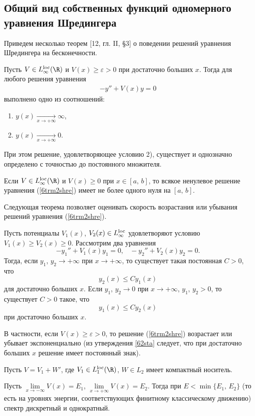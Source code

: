 \documentclass[a4paper
]{article}
\begin{document}
\subsection{Общий вид собственных функций одномерного уравнения Шредингера}
Приведем несколько теорем [12, гл. II, \S 3] о поведении решений
уравнения Шредингера на бесконечности.
\begin{Trm}
\label{62trm2}
Пусть $V\in L_\infty^{{\rm loc}}(\R)$ и $V(x)\ge \varepsilon>0$ при
достаточно больших $x$. Тогда для любого решения уравнения
\begin{align}
\label{6trm2shre}
-y''+V(x)y=0
\end{align}
выполнено одно из соотношений:
\begin{enumerate}
\item $y(x)\underset{x\rightarrow +\infty}{\rightarrow} \infty$,
\item $y(x)\underset{x\rightarrow +\infty}{\rightarrow} 0$.
\end{enumerate}
При этом решение, удовлетворяющее условию 2), существует и однозначно
определено с точностью до постоянного множителя.
\end{Trm}
\begin{Sta}
\label{62sta}
Если $V\in L_\infty^{{\rm loc}}(\R)$ и $V(x)\ge 0$ при $x\in [a, \, b]$,
то всякое ненулевое решение уравнения (\ref{6trm2shre}) имеет не более одного
нуля на $[a, \, b]$.
\end{Sta}
Следующая теорема позволяет оценивать скорость возрастания или убывания
решений уравнения (\ref{6trm2shre}).
\begin{Trm}
\label{62trm3}
Пусть потенциалы $V_1(x)$, $V_2(x)\in L_\infty^{{\rm loc}}$ удовлетворяют
условию $V_1(x)\ge V_2(x)\ge 0$. Рассмотрим два уравнения
$$-y_1''+V_1(x)y_1=0, \;\;\; -y_2''+V_2(x)y_2=0.$$
Тогда, если $y_1$, $y_2\rightarrow +\infty$ при $x\rightarrow +\infty$, то
существует такая постоянная $C>0$, что $$y_2(x)\le Cy_1(x)$$ для
достаточно больших $x$. Если $y_1$, $y_2\rightarrow 0$ при $x\rightarrow +\infty$,
$y_1$, $y_2>0$, то существует $C>0$ такое, что $$y_1(x)\le Cy_2(x)$$ при
достаточно больших $x$.
\end{Trm}
В частности, если $V(x)\ge \varepsilon>0$, то решение (\ref{6trm2shre})
возрастает или убывает экспоненциально (из утверждения \ref{62sta}
следует, что при достаточно больших $x$ решение имеет постоянный знак). \par
Пусть $V=V_1+W'$, где $V_1\in L_1^{{\rm loc}}(\R)$, $W\in L_2$ имеет
компактный носитель.
\begin{Cor}
Пусть $\lim \limits _{x\rightarrow -\infty}V(x)=E_1$,
$\lim \limits _{x \rightarrow +\infty}V(x)=E_2$. Тогда при $E<\min
\{E_1, \, E_2\}$ (то есть на уровнях энергии, соответствующих
финитному классическому движению) спектр дискретный и однократный.
\end{Cor}
\end{document}
